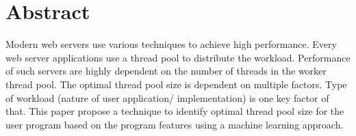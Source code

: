 \chapter*{Abstract}

Modern web servers use various techniques to achieve high performance. Every web server applications use a thread pool to distribute the workload. Performance of such servers are highly dependent on the number of threads in the worker thread pool. The optimal thread pool size is dependent on multiple factors. Type of workload (nature of
user application/ implementation) is one key factor of that. This paper propose a technique to identify optimal thread pool size for the user program based on the program features using a machine learning approach.
